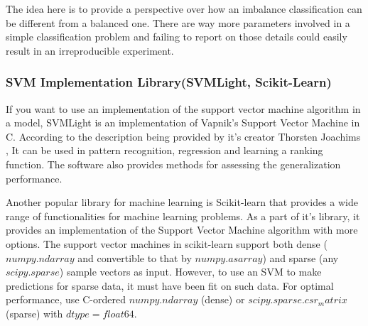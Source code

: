 The idea here is to provide a perspective over how an imbalance classification can be different 
from a balanced one. There are way more parameters involved in a simple classification problem 
and failing to report on those details could easily result in an irreproducible experiment.

\subsubsection{SVM Implementation Library(SVMLight, Scikit-Learn)}
If you want to use an implementation of the support vector machine algorithm in a model,  
SVMLight is an implementation of Vapnik's Support Vector Machine \cite{vapnik2013nature} 
in C. According  to the description being provided by it’s creator 
Thorsten Joachims \cite{joachims2002learning}, It can be used in pattern recognition, 
regression and learning a ranking function. The software also provides methods for assessing 
the generalization performance.

Another popular library for machine learning is Scikit-learn \cite{Pedregosa2011scikitlearn} 
that provides a wide range of functionalities for machine learning problems. As a part of 
it's library, it provides an implementation of the Support Vector Machine algorithm with 
more options. The support vector machines in scikit-learn support both dense 
($numpy.ndarray$ and convertible to that by $numpy.asarray$) and sparse 
(any $scipy.sparse$) sample vectors as input. However, to use an SVM to make predictions 
for sparse data, it must have been fit on such data. For optimal performance, use C-ordered 
$numpy.ndarray$ (dense) or $scipy.sparse.csr_matrix$ (sparse) with $dtype=float64$.
